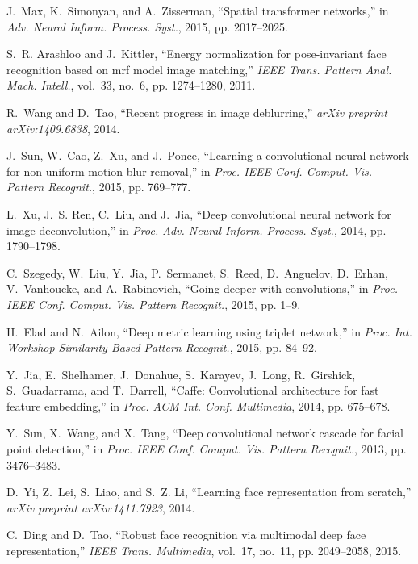 \documentclass[10pt,journal,cspaper,compsoc]{IEEEtran}
\begin{document}
\begin{thebibliography}{10}
J.~Max, K.~Simonyan, and A.~Zisserman, ``Spatial transformer networks,'' in
  \emph{Adv. Neural Inform. Process. Syst.}, 2015, pp. 2017--2025.

S.~R. Arashloo and J.~Kittler, ``Energy normalization for pose-invariant face
  recognition based on mrf model image matching,'' \emph{IEEE Trans. Pattern
  Anal. Mach. Intell.}, vol.~33, no.~6, pp. 1274--1280, 2011.

R.~Wang and D.~Tao, ``Recent progress in image deblurring,'' \emph{arXiv
  preprint arXiv:1409.6838}, 2014.

J.~Sun, W.~Cao, Z.~Xu, and J.~Ponce, ``Learning a convolutional neural network
  for non-uniform motion blur removal,'' in \emph{Proc. IEEE Conf. Comput. Vis.
  Pattern Recognit.}, 2015, pp. 769--777.

L.~Xu, J.~S. Ren, C.~Liu, and J.~Jia, ``Deep convolutional neural network for
  image deconvolution,'' in \emph{Proc. Adv. Neural Inform. Process. Syst.},
  2014, pp. 1790--1798.

C.~Szegedy, W.~Liu, Y.~Jia, P.~Sermanet, S.~Reed, D.~Anguelov, D.~Erhan,
  V.~Vanhoucke, and A.~Rabinovich, ``Going deeper with convolutions,'' in
  \emph{Proc. IEEE Conf. Comput. Vis. Pattern Recognit.}, 2015, pp. 1--9.

H.~Elad and N.~Ailon, ``Deep metric learning using triplet network,'' in
  \emph{Proc. Int. Workshop Similarity-Based Pattern Recognit.}, 2015, pp.
  84--92.

Y.~Jia, E.~Shelhamer, J.~Donahue, S.~Karayev, J.~Long, R.~Girshick,
  S.~Guadarrama, and T.~Darrell, ``Caffe: Convolutional architecture for fast
  feature embedding,'' in \emph{Proc. ACM Int. Conf. Multimedia}, 2014, pp.
  675--678.

Y.~Sun, X.~Wang, and X.~Tang, ``Deep convolutional network cascade for facial
  point detection,'' in \emph{Proc. IEEE Conf. Comput. Vis. Pattern Recognit.},
  2013, pp. 3476--3483.

D.~Yi, Z.~Lei, S.~Liao, and S.~Z. Li, ``Learning face representation from
  scratch,'' \emph{arXiv preprint arXiv:1411.7923}, 2014.

C.~Ding and D.~Tao, ``Robust face recognition via multimodal deep face
  representation,'' \emph{IEEE Trans. Multimedia}, vol.~17, no.~11, pp.
  2049--2058, 2015.


\end{thebibliography}
\end{document}
